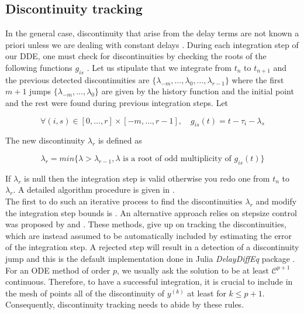 \documentclass[pmlr]{jmlr}%
\begin{document}
\subsection{Discontinuity tracking}

In the general case, discontinuity that arise from the delay terms are not known a priori unless we are dealing with constant delays \citep{constant_delay_dde}. During each integration step of our DDE, one must check for discontinuities by checking the roots of the following functions $g_{is}$ \citep{numerical_dde}. Let us stipulate that we integrate from $t_n$ to $t_{n+1}$ and the previous detected discontinuities are $\{ \lambda_{-m}, \dots, \lambda_0, \dots, \lambda_{r-1} \}$ where the first $m+1$ jumps $\{ \lambda_{-m}, \dots, \lambda_0 \}$ are given by the history function and the initial point and the rest were found during previous integration steps. Let 

\begin{equation}
    \forall (i,s) \in [0, \dots, r] \times [-m, \dots,r-1],\quad g_{is}(t) = t - \tau_i - \lambda_s
\end{equation}

The new discontinuity $\lambda_r$ is defined as

\begin{equation}
    \lambda_r = min \{\lambda > \lambda_{r-1},  \lambda \text{ is a root of odd multiplicity of } g_{is}(t) \}
\end{equation}

If $\lambda_r$ is null then the integration step is valid otherwise you redo one from $t_n$ to $\lambda_r$. A detailed algorithm procedure is given in \cite{numerical_dde}. \\

The first to do such an iterative process to find the discontinuities $\lambda_r$ and modify the integration step bounds is \cite{discontinuity_tracking}. An alternative approach relies on stepsize control was proposed by \cite{first_time_discont_tracking} and \cite{neves}. These methods, give up on tracking the discontinuities, which are instead assumed to be automatically included by estimating the error of the integration step. A rejected step will result in a detection of a discontinuity jump and this is the default implementation done in Julia  \textit{DelayDiffEq} package \citep{julia_dde}. \\

For an ODE method of order $p$, we usually ask the solution to be at least $\mathcal{C}^{p+1}$ continuous. Therefore, to have a successful integration, it is crucial to include in the mesh of points all of the discontinuity of $y^{(k)}$ at least for $k \leq p+1$. Consequently, discontinuity tracking needs to abide by these rules.
\end{document}
